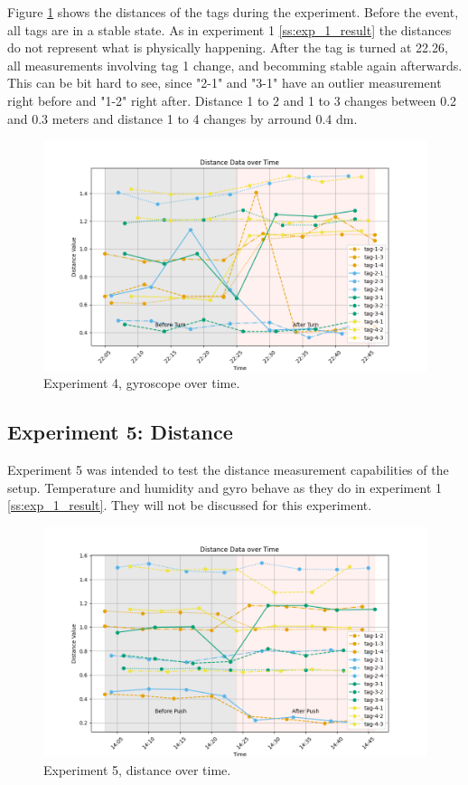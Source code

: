 Figure \ref{f:exp4_graphs_dist} shows the distances of the tags during the experiment.
Before the event, all tags are in a stable state.
As in experiment 1 \ref{ss:exp_1_result} the distances do not represent what is physically happening.
After the tag is turned at 22.26, all measurements involving tag 1 change, and becomming stable again afterwards.
This can be bit hard to see, since "2-1" and "3-1" have an outlier measurement right before and "1-2" right after.
Distance 1 to 2 and 1 to 3 changes between 0.2 and 0.3 meters and distance 1 to 4 changes by arround 0.4 dm.

\begin{figure}[ht!]
	\includegraphics[width=\linewidth]{graphics/exp/exp4_dist_data_plot_1.png}
	\caption{Experiment 4, gyroscope over time.}
	\label{f:exp4_graphs_dist}
\end{figure}


\subsection{Experiment 5: Distance}
\label{ss:exp_3_result}

Experiment 5 was intended to test the distance measurement capabilities of the setup.
Temperature and humidity and gyro behave as they do in experiment 1 \ref{ss:exp_1_result}.
They will not be discussed for this experiment.

\begin{figure}[ht!]
	\includegraphics[width=\linewidth]{graphics/exp/exp5_dist_data_plot_2.png}
	\caption{Experiment 5, distance over time.}
	\label{f:exp5_graphs_dist}
\end{figure}

